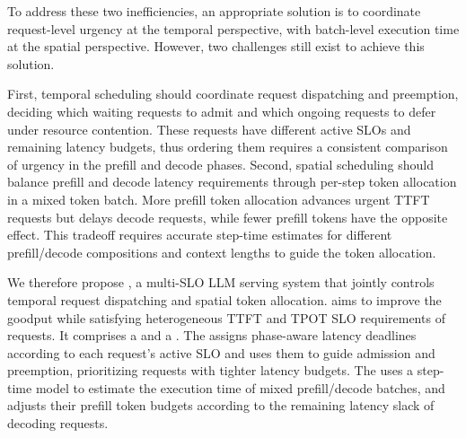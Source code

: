 To address these two inefficiencies, an appropriate solution is to coordinate request-level urgency at the temporal perspective, with batch-level execution time at the spatial perspective.
However, two challenges still exist to achieve this solution.

First, temporal scheduling should coordinate request dispatching and preemption, deciding which waiting requests to admit and which ongoing requests to defer under resource contention.
These requests have different active SLOs and remaining latency budgets, thus ordering them requires a consistent comparison of urgency in the prefill and decode phases.
Second, spatial scheduling should balance prefill and decode latency requirements through per-step token allocation in a mixed token batch.
More prefill token allocation advances urgent TTFT requests but delays decode requests, while fewer prefill tokens have the opposite effect.
This tradeoff requires accurate step-time estimates for different prefill/decode compositions and context lengths to guide the token allocation.


We therefore propose \tango{}, a multi-SLO LLM serving system that jointly controls temporal request dispatching and spatial token allocation.
\tango{} aims to improve the goodput while satisfying heterogeneous TTFT and TPOT SLO requirements of requests.
It comprises a \dispatcher{} and a \allocator{}.
The \dispatcher{} assigns phase-aware latency deadlines according to each request's active SLO and uses them to guide admission and preemption, prioritizing requests with tighter latency budgets.
The \allocator{} uses a step-time model to estimate the execution time of mixed prefill/decode batches, and adjusts their prefill token budgets according to the remaining latency slack of decoding requests.

